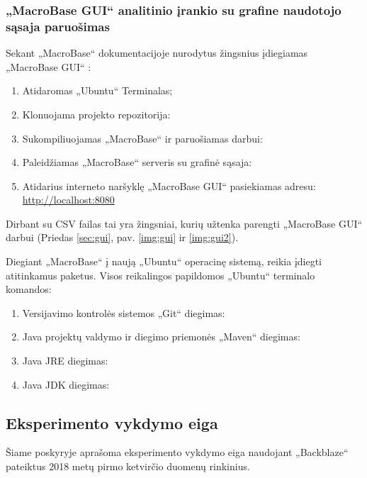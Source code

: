 \documentclass{VUMIFPSkursinis}
\begin{document}
\subsubsection{„MacroBase GUI“ analitinio įrankio su grafine naudotojo sąsaja paruošimas}
Sekant „MacroBase“ dokumentacijoje nurodytus žingsnius įdiegiamas „MacroBase GUI“ \cite{macrobase_doc}:
\begin{enumerate}
\item Atidaromas „Ubuntu“ Terminalas;
\item Klonuojama projekto repozitorija:\\
\item Sukompiliuojamas „MacroBase“ ir paruošiamas darbui:\\
\item Paleidžiamas „MacroBase“ serveris su grafinė sąsaja:\\
\item Atidarius interneto naršyklę „MacroBase GUI“ pasiekiamas adresu: \\\url{http://localhost:8080}
\end{enumerate}
Dirbant su CSV failas tai yra žingsniai, kurių užtenka parengti „MacroBase GUI“ darbui (Priedas \ref{sec:gui}, pav. \ref{img:gui} ir \ref{img:gui2}).

Diegiant „MacroBase“ į naują „Ubuntu“ operacinę sistemą, reikia įdiegti atitinkamus paketus. Visos reikalingos papildomos „Ubuntu“ terminalo komandos:
\begin{enumerate}
\item Versijavimo kontrolės sistemos „Git“ \cite{git} diegimas:\\
\item Java projektų valdymo ir diegimo priemonės „Maven“ \cite{maven} diegimas:\\
\item Java JRE \cite{jre_jdk} diegimas:\\
\item Java JDK \cite{jre_jdk} diegimas:\\
\end{enumerate}

\subsection{Eksperimento vykdymo eiga}
Šiame poskyryje aprašoma eksperimento vykdymo eiga naudojant „Backblaze“ pateiktus 2018 metų pirmo ketvirčio duomenų rinkinius. 
\end{document}
